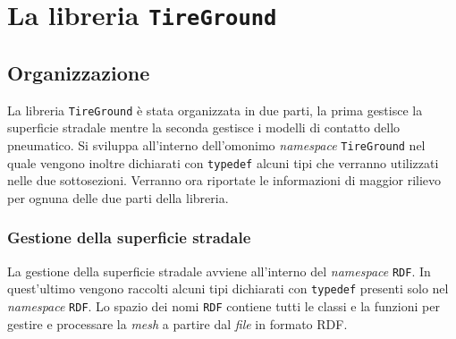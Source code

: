 \chapter{La libreria \texttt{TireGround}}
\label{Codice}
%
\section{Organizzazione}
La libreria \texttt{TireGround} è stata organizzata in due parti, la prima gestisce la superficie stradale mentre la seconda gestisce i modelli di contatto dello pneumatico. Si sviluppa all'interno dell'omonimo \textit{namespace} \texttt{TireGround} nel quale vengono inoltre dichiarati con \texttt{typedef} alcuni tipi che verranno utilizzati nelle due sottosezioni. Verranno ora riportate le informazioni di maggior rilievo per ognuna delle due parti della libreria.

\subsection{Gestione della superficie stradale} 
La gestione della superficie stradale avviene all'interno del \textit{namespace} \texttt{RDF}. In quest'ultimo vengono raccolti alcuni tipi dichiarati con \texttt{typedef} presenti solo nel \textit{namespace} \texttt{RDF}. Lo spazio dei nomi \texttt{RDF} contiene tutti le classi e la funzioni per gestire e processare la \textit{mesh} a partire dal \textit{file} in formato \ac{RDF}.
%
